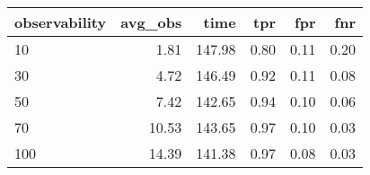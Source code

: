 \begin{tabular}{lrrrrr}
\toprule
observability &  avg\_obs &   time &  tpr &  fpr &  fnr \\
\midrule
           10 &     1.81 & 147.98 & 0.80 & 0.11 & 0.20 \\
           30 &     4.72 & 146.49 & 0.92 & 0.11 & 0.08 \\
           50 &     7.42 & 142.65 & 0.94 & 0.10 & 0.06 \\
           70 &    10.53 & 143.65 & 0.97 & 0.10 & 0.03 \\
          100 &    14.39 & 141.38 & 0.97 & 0.08 & 0.03 \\
\bottomrule
\end{tabular}
